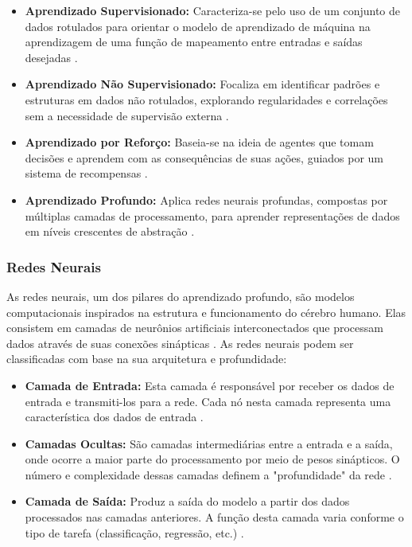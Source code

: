 \documentclass[conference]{IEEEtran}
\begin{document}
\begin{itemize}
\item {\textbf{Aprendizado Supervisionado:}}
Caracteriza-se pelo uso de um conjunto de dados rotulados para orientar o modelo 
de aprendizado de máquina na aprendizagem de uma função de mapeamento entre 
entradas e saídas desejadas \cite{Mohri2018}.
\item {\textbf{Aprendizado Não Supervisionado:}}
Focaliza em identificar padrões e estruturas em dados não rotulados, 
explorando regularidades e correlações sem a necessidade de supervisão externa \cite{Hinton2006}.
\item {\textbf{Aprendizado por Reforço:}}
Baseia-se na ideia de agentes que tomam decisões e aprendem com 
as consequências de suas ações, guiados por um sistema de recompensas \cite{Sutton2018}.
\item {\textbf{Aprendizado Profundo:}}
Aplica redes neurais profundas, compostas por múltiplas camadas de processamento, 
para aprender representações de dados em níveis crescentes de abstração \cite{LeCun2015}.
\end{itemize}

\subsubsection{Redes Neurais} As redes neurais, um dos pilares do aprendizado profundo, 
são modelos computacionais inspirados na estrutura e funcionamento do cérebro humano. 
Elas consistem em camadas de neurônios artificiais interconectados que processam dados 
através de suas conexões sinápticas \cite{Haykin2009}. 
As redes neurais podem ser classificadas com base na sua arquitetura e profundidade:

\begin{itemize}
\item {\textbf{Camada de Entrada:}}
Esta camada é responsável por receber os dados de entrada e transmiti-los para a rede. 
Cada nó nesta camada representa uma característica dos dados de entrada \cite{Goodfellow2016}.
\item {\textbf{Camadas Ocultas:}}
São camadas intermediárias entre a entrada e a saída, onde ocorre a maior parte do 
processamento por meio de pesos sinápticos. O número e complexidade dessas camadas 
definem a "profundidade" da rede \cite{Schmidhuber2015}.
\item {\textbf{Camada de Saída:}}
Produz a saída do modelo a partir dos dados processados nas camadas anteriores. 
A função desta camada varia conforme o 
tipo de tarefa (classificação, regressão, etc.) \cite{LeCun2015}.
\end{itemize}
\end{document}
